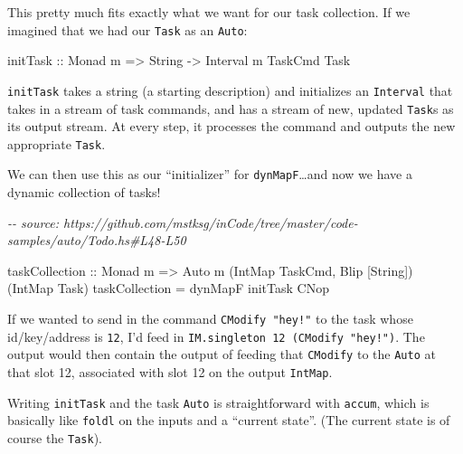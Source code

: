 \documentclass[]{article}
\newenvironment{Shaded}{}{}
\newcommand{\CommentTok}[1]{\textcolor[rgb]{0.38,0.63,0.69}{\textit{#1}}}
\newcommand{\DataTypeTok}[1]{\textcolor[rgb]{0.56,0.13,0.00}{#1}}
\newcommand{\NormalTok}[1]{#1}
\newcommand{\OtherTok}[1]{\textcolor[rgb]{0.00,0.44,0.13}{#1}}
\begin{document}
This pretty much fits exactly what we want for our task collection. If we
imagined that we had our \texttt{Task} as an \texttt{Auto}:

\begin{Shaded}
\begin{Highlighting}[]
\OtherTok{initTask ::} \DataTypeTok{Monad}\NormalTok{ m }\OtherTok{=>} \DataTypeTok{String} \OtherTok{{-}>} \DataTypeTok{Interval}\NormalTok{ m }\DataTypeTok{TaskCmd} \DataTypeTok{Task}
\end{Highlighting}
\end{Shaded}

\texttt{initTask} takes a string (a starting description) and initializes an
\texttt{Interval} that takes in a stream of task commands, and has a stream of
new, updated \texttt{Task}s as its output stream. At every step, it processes
the command and outputs the new appropriate \texttt{Task}.

We can then use this as our ``initializer'' for \texttt{dynMapF}\ldots and now
we have a dynamic collection of tasks!

\begin{Shaded}
\begin{Highlighting}[]
\CommentTok{{-}{-} source: https://github.com/mstksg/inCode/tree/master/code{-}samples/auto/Todo.hs\#L48{-}L50}

\OtherTok{taskCollection ::} \DataTypeTok{Monad}\NormalTok{ m}
               \OtherTok{=>} \DataTypeTok{Auto}\NormalTok{ m (}\DataTypeTok{IntMap} \DataTypeTok{TaskCmd}\NormalTok{, }\DataTypeTok{Blip}\NormalTok{ [}\DataTypeTok{String}\NormalTok{]) (}\DataTypeTok{IntMap} \DataTypeTok{Task}\NormalTok{)}
\NormalTok{taskCollection }\OtherTok{=}\NormalTok{ dynMapF initTask }\DataTypeTok{CNop}
\end{Highlighting}
\end{Shaded}

If we wanted to send in the command \texttt{CModify\ "hey!"} to the task whose
id/key/address is \texttt{12}, I'd feed in
\texttt{IM.singleton\ 12\ (CModify\ "hey!")}. The output would then contain the
output of feeding that \texttt{CModify} to the \texttt{Auto} at that slot 12,
associated with slot 12 on the output \texttt{IntMap}.

Writing \texttt{initTask} and the task \texttt{Auto} is straightforward with
\texttt{accum}, which is basically like \texttt{foldl} on the inputs and a
``current state''. (The current state is of course the \texttt{Task}).
\end{document}
